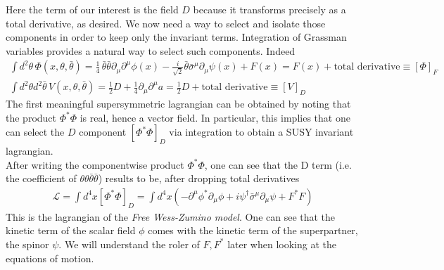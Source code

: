 \documentclass[12pt]{article}
\begin{document}
Here the term of our interest is the field $D$ because it transforms precisely as a total derivative, as desired. 
We now need a way to select and isolate those components in order to keep only the invariant terms. Integration of Grassman variables provides a natural way to select such components. Indeed 
\begin{gather*}
  \int d^2\theta \, \Phi(x, \theta, \bar\theta) = \frac{1}{4} \, \bar\theta \bar\theta \partial_\mu \partial^\mu \phi(x) - \frac{i}{\sqrt{2}} \bar\theta \bar\sigma^\mu \partial_\mu \psi(x) + F(x) = F(x) + \text{total derivative} \equiv \left[\Phi\right]_F \\
  \int d^2\theta d^2\bar\theta \, V(x, \theta, \bar\theta) = \frac{1}{2} D + \frac{1}{4} \partial_\mu \partial^\mu a = \frac{1}{2} D + \text{total derivative} \equiv \left[V\right]_D
\end{gather*}
The first meaningful supersymmetric lagrangian can be obtained by noting that the product $\Phi^*\Phi$ is real, hence a vector field. In particular, this implies that one can select the $D$ component $\left[\Phi^*\Phi\right]_D$ via integration to obtain a SUSY invariant lagrangian. \\
After writing the componentwise product $\Phi^*\Phi$, one can see that the D term (i.e. the coefficient of $\theta\theta\bar\theta\bar\theta$) results to be, after dropping total derivatives
\begin{gather*}
  \mathcal{L} = \int d^4 x \left[\Phi^*\Phi\right]_D = \int d^4 x \left( -\partial^\mu \phi^* \partial_\mu \phi + i \psi^\dagger \bar\sigma^\mu \partial_\mu \psi + F^*F \right)
\end{gather*}
This is the lagrangian of the \emph{Free Wess-Zumino model}. One can see that the kinetic term of the scalar field $\phi$ comes with the kinetic term of the superpartner, the spinor $\psi$. We will understand the roler of $F, F^*$ later when looking at the equations of motion. \par 

\newpage 
\end{document}
